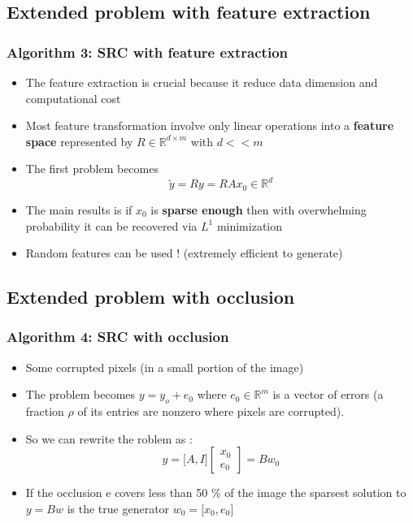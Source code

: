 \documentclass{beamer}
\begin{document}
\subsection{Extended problem with feature extraction}


\begin{frame}

		\frametitle{Algorithm 3: SRC with feature extraction}		

\begin{itemize}			
\item The feature extraction is crucial because it reduce data dimension and computational cost
\item Most feature transformation involve only linear operations into a \textbf{feature space} represented by $R \in \mathbb{R}^{d \times m}$ with $d <<m$ 
\item The first problem becomes $$\widetilde{y}=Ry=RAx_{0} \in \mathbb{R}^{d}$$
\item The main  results is if $x_{0}$ is \textbf{sparse enough} then with overwhelming probability it can be recovered via $L^{1}$ minimization
\item Random features can be used ! (extremely efficient to generate)
\end{itemize}

\end{frame}

\subsection{Extended problem with occlusion}


\begin{frame}

		\frametitle{Algorithm 4: SRC with occlusion}		

\begin{itemize}

\item Some corrupted pixels (in a small portion of the image)
\item The problem becomes $y=y_{o}+e_{0}$ where $e_{0} \in \mathbb{R}^{m}$ is a vector of errors (a fraction $\rho$ of its entries are nonzero where pixels are corrupted). 
\item So we can rewrite the roblem as : $$y = \lbrack A,I \rbrack 
\begin{bmatrix}
           x_{0} \\
           e_{0} 
\end{bmatrix}=Bw_{0}$$

\item If the occlusion e covers less than 50 \% of the image the sparsest solution to $y=Bw$ is the true generator $w_{0}=\lbrack x_{0},e_{0} \rbrack $


\end{itemize}

\end{frame}
\end{document}
